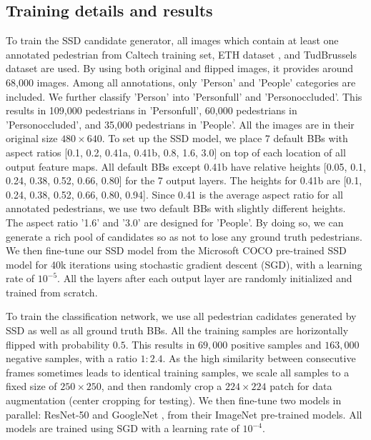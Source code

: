 \documentclass[10pt,letterpaper]{article}
\begin{document}
\subsection{Training details and results}
To train the SSD candidate generator, all images which contain at least one annotated pedestrian from Caltech training set, ETH dataset \cite{eth}, and TudBrussels dataset \cite{Tudbrussel} are used. By using both original and flipped images, it provides around 68,000 images. Among all annotations, only 'Person' and 'People' categories are included. We further classify 'Person' into 'Person\textunderscore full' and 'Person\textunderscore occluded'. This results in 109,000 pedestrians in 'Person\textunderscore full', 60,000 pedestrians in 'Person\textunderscore occluded', and 35,000 pedestrians in 'People'. All the images are in their original size $480\times 640$. To set up the SSD model, we place 7 default BBs with aspect ratios [0.1, 0.2, 0.41a, 0.41b, 0.8, 1.6, 3.0] on top of each location of all output feature maps. All default BBs except 0.41b have relative heights [0.05, 0.1, 0.24, 0.38, 0.52, 0.66, 0.80] for the 7 output layers. The heights for 0.41b are [0.1, 0.24, 0.38, 0.52, 0.66, 0.80, 0.94]. Since 0.41 is the average aspect ratio for all annotated pedestrians, we use two default BBs with slightly different heights. The aspect ratio '1.6' and '3.0' are designed for 'People'. By doing so, we can generate a rich pool of candidates so as not to lose any ground truth pedestrians. We then fine-tune our SSD model from the Microsoft COCO \cite{coco} pre-trained SSD model for 40k iterations using stochastic gradient descent (SGD), with a learning rate of $10^{-5}$. All the layers after each output layer are randomly initialized and trained from scratch.   

To train the classification network, we use all pedestrian cadidates generated by SSD as well as all ground truth BBs. All the training samples are horizontally flipped with probability $0.5$. This results in $69,000$ positive samples and $163,000$ negative samples, with a ratio $1:2.4$. As the high similarity between consecutive frames sometimes leads to identical training samples, we scale all samples to a fixed size of $250\times 250$, and then randomly crop a $224\times 224$ patch for data augmentation (center cropping for testing). We then fine-tune two models in parallel: ResNet-50 \cite{res50} and GoogleNet \cite{googlenet}, from their ImageNet pre-trained models. All models are trained using SGD with a learning rate of $10^{-4}$. 
\end{document}
